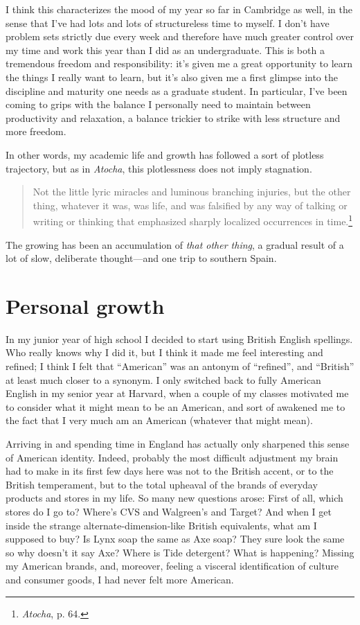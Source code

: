 I think this characterizes the mood of my year so far in Cambridge as well, in the sense that I've had lots and lots of structureless time to myself. I don't have problem sets strictly due every week and therefore have much greater control over my time and  work this year than I did as an undergraduate. This is both a tremendous freedom and responsibility: it's given me a great opportunity to learn the things I really want to learn, but it's also given me a first glimpse into the discipline and maturity one needs as a graduate student. In particular, I've been coming to grips with the balance I personally need to maintain between productivity and relaxation, a balance trickier to strike with less structure and more freedom.

In other words, my academic life and growth has followed a sort of plotless trajectory, but as in \emph{Atocha}, this plotlessness does not imply stagnation.
\begin{quote}
  Not the little lyric miracles and luminous branching injuries, but the other thing, whatever it was, was life, and was falsified by any way of talking or writing or thinking that emphasized sharply localized occurrences in time.\footnote{\emph{Atocha}, p. 64.}
\end{quote}
The growing has been an accumulation of \emph{that other thing}, a gradual result of a lot of slow, deliberate thought---and one trip to southern Spain.



\section*{Personal growth}

In my junior year of high school I decided to start using British English spellings. Who really knows why I did it, but I think it made me feel interesting and refined; I think I felt that ``American'' was an antonym of ``refined'', and ``British'' at least much closer to a synonym. I only switched back to fully American English in my senior year at Harvard, when a couple of my classes motivated me to consider what it might mean to be an American, and sort of awakened me to the fact that I very much am an American (whatever that might mean).

Arriving in and spending time in England has actually only sharpened this sense of American identity. Indeed, probably the most difficult adjustment my brain had to make in its first few days here was not to the British accent, or to the British temperament, but to the total upheaval of the brands of everyday products and stores in my life. So many new questions arose: First of all, which stores do I go to? Where's CVS and Walgreen's and Target? And when I get inside the strange alternate-dimension-like British equivalents, what am I supposed to buy? Is Lynx soap the same as Axe soap? They sure look the same so why doesn't it say Axe? Where is Tide detergent? What is happening? Missing my American brands, and, moreover, feeling a visceral identification of culture and consumer goods, I had never felt more American.


